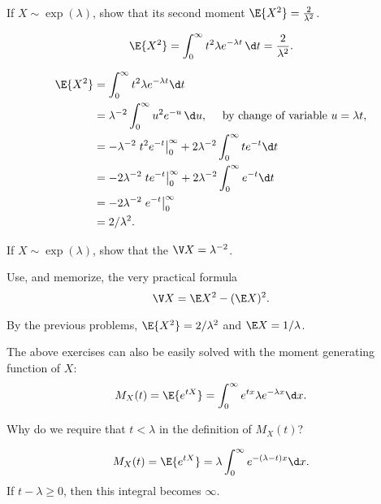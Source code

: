 \begin{exercise}\label{ex:15} 
  If $X\sim\exp(\lambda)$, show that its second moment $\E{X^2} =  \frac{2}{\lambda^2}$.
  \begin{hint}
  \begin{equation*}
  \E{X^2}= \int_0^\infty t^2 \lambda e^{-\lambda t}\, \d t =  \frac{2}{\lambda^2}.
  \end{equation*}
  \end{hint}
  \begin{solution}
    \begin{align*}
\E{X^2} 
&= \int_0^\infty t^2 \lambda e^{-\lambda t} \d t \\
&=   \lambda^{-2} \int_0^\infty u^2 e^{-u}\, \d u, \quad \text{ by  change of variable $u=\lambda t$},   \\
&= -\lambda^{-2}\left. t^2 e^{- t}\right|_0^\infty + 2\lambda^{-2}\int_0^\infty t e^{- t} \d t \\
&=  -2\lambda^{-2}\left. t e^{- t}\right|_0^\infty + 2\lambda^{-2} \int_0^\infty e^{- t} \d t\\
&=  - 2\lambda^{-2} \left. e^{- t} \right|_0^\infty \\
&=  2/\lambda^2.
    \end{align*}
  \end{solution}
\end{exercise}


\begin{exercise} 
  If $X\sim\exp(\lambda)$, show that the 
$\V X = \lambda^{-2}$.
  \begin{hint} Use, and memorize, the very practical formula
  \begin{equation*}
  \V X = \E X^2 - (\E X)^2.
  \end{equation*}
  \end{hint}
  \begin{solution}
    By the previous problems, $\E{X^2}=2/\lambda^2$ and $\E X = 1/\lambda$. 
  \end{solution}
\end{exercise}

The  above exercises can also be easily solved with the moment generating function of $X$:
\begin{equation}\label{eq:60}
  M_X(t) = \E{e^{t X}} = \int_0^\infty e^{t x} \lambda e^{-\lambda x} \d x.
\end{equation}

\begin{exercise}
Why do we require that $t < \lambda$ in the definition of $M_X(t)$?
\begin{solution}
\begin{equation*}
  M_X(t) = \E{e^{t X}} = \lambda \int_0^\infty e^{-(\lambda-t) x}\d x.
\end{equation*}
  If $t - \lambda \geq 0$, then this integral becomes $\infty$. 
\end{solution}
\end{exercise}

